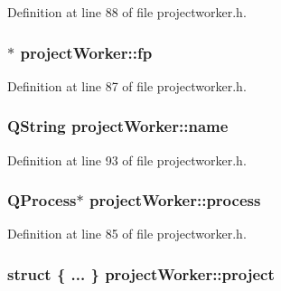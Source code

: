 Definition at line 88 of file projectworker.\+h.

\hypertarget{classproject_worker_a3e67d186faa22b7cfa338ae9e0272da0}{
\subsubsection[{fp}]{$\ast$ project\+Worker\+::fp\hspace{0.3cm}{\ttfamily [private]}}}\label{classproject_worker_a3e67d186faa22b7cfa338ae9e0272da0}


Definition at line 87 of file projectworker.\+h.

\hypertarget{classproject_worker_a133798ef8a45a15919e4f65e2bb3df71}{
\subsubsection[{name}]{\setlength{\rightskip}{0pt plus 5cm}Q\+String project\+Worker\+::name}}\label{classproject_worker_a133798ef8a45a15919e4f65e2bb3df71}


Definition at line 93 of file projectworker.\+h.

\hypertarget{classproject_worker_a862f3fc1a316f1542e843281e2667344}{
\subsubsection[{process}]{\setlength{\rightskip}{0pt plus 5cm}Q\+Process$\ast$ project\+Worker\+::process\hspace{0.3cm}{\ttfamily [private]}}}\label{classproject_worker_a862f3fc1a316f1542e843281e2667344}


Definition at line 85 of file projectworker.\+h.

\hypertarget{classproject_worker_a1e4589fdd07b5d6063e703b211dd8aa9}{
\subsubsection[{project}]{\setlength{\rightskip}{0pt plus 5cm}struct \{ ... \}   project\+Worker\+::project\hspace{0.3cm}{\ttfamily [private]}}}\label{classproject_worker_a1e4589fdd07b5d6063e703b211dd8aa9}


